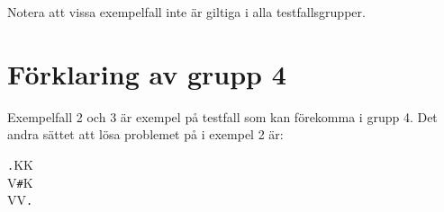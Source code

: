 Notera att vissa exempelfall inte är giltiga i alla testfallsgrupper.

\section*{Förklaring av grupp 4}
Exempelfall 2 och 3 är exempel på testfall som kan förekomma i grupp 4. Det andra sättet att lösa problemet på i exempel 2 är:

\verb!.!KK\\
V\verb!#!K\\
VV\verb!.!\\

